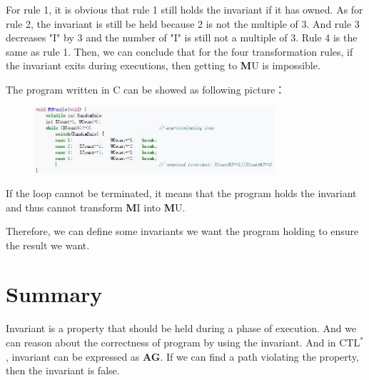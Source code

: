 \documentclass[11pt, conference]{IEEEtran}
\begin{document}
        For rule 1, it is obvious that rule 1 still holds the invariant if it has owned. As for rule 2, the invariant is still be held because 2 is not the multiple of 3. And rule 3 decreases "I" by 3 and the number of "I" is still not a multiple of 3. Rule 4 is the same as rule 1. Then, we can conclude that for the four transformation rules, if the invariant exits during executions, then getting to {\textbf MU} is impossible.

        The program written in C can be showed as following picture：
        \begin{figure}[H]
            \centering
            \includegraphics[width=3.5in]{3.jpg}
        \end{figure}

        If the loop cannot be terminated, it means that the program holds the invariant and thus cannot transform {\textbf MI} into {\textbf MU}.

        Therefore, we can define some invariants we want the program holding to ensure the result we want.

    \section{Summary}
        Invariant is a property that should be held during a phase of execution. And we can reason about the correctness of program by using the invariant. And in $\text{CTL}^*$, invariant can be expressed as \textbf{AG}. If we can find a path violating the property, then the invariant is false.
\end{document}
